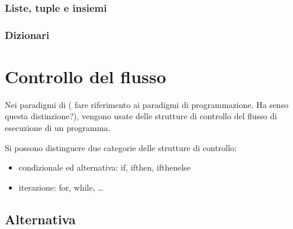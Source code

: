 \documentclass[letterpaper,10pt,italian]{jupyterBook}
\begin{document}
\subsection{Liste, tuple e insiemi}
\label{\detokenize{ch/programming/types:liste-tuple-e-insiemi}}

\subsection{Dizionari}
\label{\detokenize{ch/programming/types:dizionari}}
\sphinxstepscope


\chapter{Controllo del flusso}
\label{\detokenize{ch/programming/flow_control:controllo-del-flusso}}\label{\detokenize{ch/programming/flow_control::doc}}
\sphinxAtStartPar
Nei paradigmi di  ( fare riferimento ai paradigmi di programmazione. Ha senso questa distinzione?), vengono usate delle strutture di controllo del flusso di esecuzione di un programma.

\sphinxAtStartPar
Si possono distinguere due categorie delle strutture di controllo:
\begin{itemize}
\item {} 
\sphinxAtStartPar
condizionale ed alternativa: if, if\sphinxhyphen{}then, if\sphinxhyphen{}then\sphinxhyphen{}else

\item {} 
\sphinxAtStartPar
iterazione: for, while, …

\end{itemize}


\section{Alternativa}
\label{\detokenize{ch/programming/flow_control:alternativa}}
\end{document}

